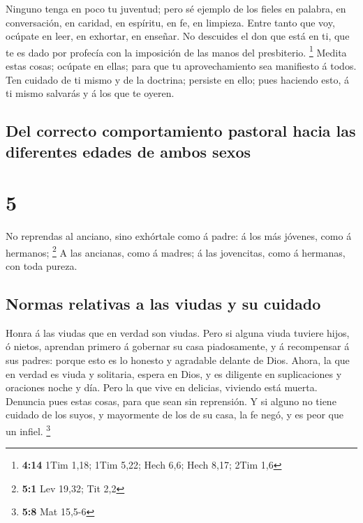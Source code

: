  Ninguno tenga en poco tu juventud; pero sé ejemplo de
los fieles en palabra, en conversación, en caridad, en espíritu, en fe,
en limpieza.  Entre tanto que voy, ocúpate en leer, en
exhortar, en enseñar.  No descuides el don que está en
ti, que te es dado por profecía con la imposición de las manos del
presbiterio. \footnote{\textbf{4:14} 1Tim 1,18; 1Tim 5,22; Hech 6,6;
  Hech 8,17; 2Tim 1,6}  Medita estas cosas; ocúpate en
ellas; para que tu aprovechamiento sea manifiesto á todos.
 Ten cuidado de ti mismo y de la doctrina; persiste en
ello; pues haciendo esto, á ti mismo salvarás y á los que te oyeren.

\hypertarget{del-correcto-comportamiento-pastoral-hacia-las-diferentes-edades-de-ambos-sexos}{%
\subsection{Del correcto comportamiento pastoral hacia las diferentes
edades de ambos
sexos}\label{del-correcto-comportamiento-pastoral-hacia-las-diferentes-edades-de-ambos-sexos}}

\hypertarget{section-4}{%
\section{5}\label{section-4}}

 No reprendas al anciano, sino exhórtale como á padre: á
los más jóvenes, como á hermanos; \footnote{\textbf{5:1} Lev 19,32; Tit
  2,2}  A las ancianas, como á madres; á las jovencitas,
como á hermanas, con toda pureza.

\hypertarget{normas-relativas-a-las-viudas-y-su-cuidado}{%
\subsection{Normas relativas a las viudas y su
cuidado}\label{normas-relativas-a-las-viudas-y-su-cuidado}}

 Honra á las viudas que en verdad son viudas.
 Pero si alguna viuda tuviere hijos, ó nietos, aprendan
primero á gobernar su casa piadosamente, y á recompensar á sus padres:
porque esto es lo honesto y agradable delante de Dios. 
Ahora, la que en verdad es viuda y solitaria, espera en Dios, y es
diligente en suplicaciones y oraciones noche y día.  Pero
la que vive en delicias, viviendo está muerta.  Denuncia
pues estas cosas, para que sean sin reprensión.  Y si
alguno no tiene cuidado de los suyos, y mayormente de los de su casa, la
fe negó, y es peor que un infiel. \footnote{\textbf{5:8} Mat 15,5-6}


